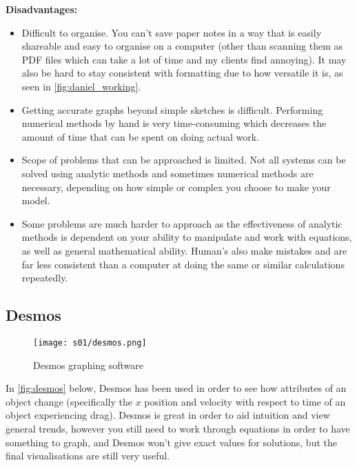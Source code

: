         \textbf{Disadvantages:}
        \begin{itemize}
            \item Difficult to organise. You can't save paper notes in a way that is easily shareable and easy to organise on a computer (other than scanning them as PDF files which can take a lot of time and my clients find annoying). It may also be hard to stay consistent with formatting due to how versatile it is, as seen in \autoref{fig:daniel_working}.
            \item Getting accurate graphs beyond simple sketches is difficult. Performing numerical methods by hand is very time-consuming which decreases the amount of time that can be spent on doing actual work. 
            \item Scope of problems that can be approached is limited. Not all systems can be solved using analytic methods and sometimes numerical methods are necessary, depending on how simple or complex you choose to make your model.
            \item Some problems are much harder to approach as the effectiveness of analytic methods is dependent on your ability to manipulate and work with equations, as well as general mathematical ability. Human's also make mistakes and are far less consistent than a computer at doing the same or similar calculations repeatedly.
        \end{itemize}

    \subsection{Desmos}

        \begin{figure}[!ht]
            \centering
            \texttt{[image: s01/desmos.png]}
            \caption{Desmos graphing software}
            \label{fig:desmos}
        \end{figure}


        In \autoref{fig:desmos} below, Desmos has been used in order to see how attributes of an object change (specifically the $x$ position and velocity with respect to time of an object experiencing drag). Desmos is great in order to aid intuition and view general trends, however you still need to work through equations in order to have something to graph, and Desmos won't give exact values for solutions, but the final visualisations are still very useful. 

